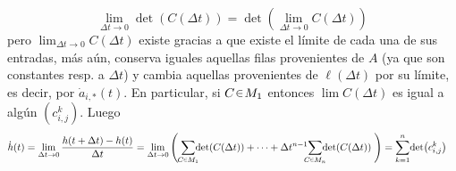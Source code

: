 \begin{sol}[Demostración]
\[
\lim_{\Delta t \to 0} \det(C(\Delta t)) = \det(\lim_{\Delta t \to 0} C(\Delta t))
\]
pero $\lim_{\Delta t \to 0} C(\Delta t)$ existe gracias a que existe el límite de cada una de sus entradas, más aún, conserva iguales aquellas filas provenientes de $A$ (ya que son constantes resp. a $\Delta t$) y cambia aquellas provenientes de $\ell(\Delta t)$ por su límite, es decir, por $\dot{a}_{i,*}(t)$. En particular, si $C \en M_1$ entonces $\lim C(\Delta t)$ es igual a algún $(c^k_{i,j})$. Luego
\begin{align*}
\dot{h}(t)
&= \lim_{\Delta t \to 0} \frac{h(t + \Delta t) - h(t)}{\Delta t}%
= \lim_{\Delta t \to 0} \left(\;%
    \sum_{\mathclap{C \en M_1}}\!\det(C(\Delta t)) + \dots + \Delta t^{n-1}\!\sum_{\mathclap{C \en M_n}}\!\det(C(\Delta t))
\;\right)
= \sum^n_{k = 1}\!\det(c^k_{i,j})
\end{align*}

\end{sol}


